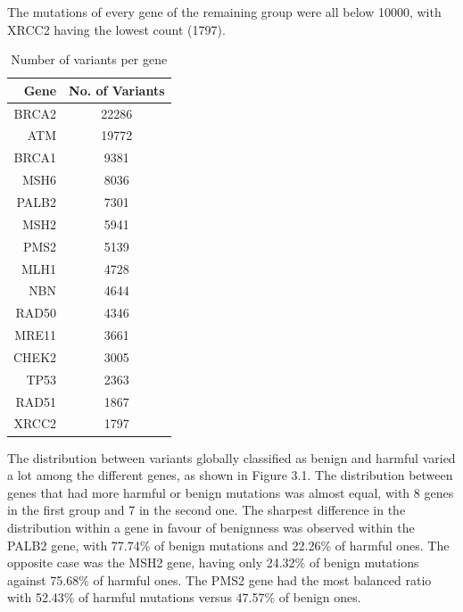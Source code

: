 \documentclass[12pt,MSc,wordcount,anon]{muthesis}
\begin{document}
\begin{flushleft}
The mutations of every gene of the remaining group were all below 10000, with XRCC2 having the lowest count (1797).

\begin{table}
\begin{center}
\begin{tabular}{|r|c|}\hline\hline
Gene&No. of Variants\\\hline
BRCA2&22286\\
ATM&19772\\
BRCA1&9381\\
MSH6&8036\\
PALB2&7301\\
MSH2&5941\\
PMS2&5139\\
MLH1&4728\\
NBN&4644\\
RAD50&4346\\
MRE11&3661\\
CHEK2&3005\\
TP53&2363\\
RAD51&1867\\
XRCC2&1797\\\hline\hline
\end{tabular}
\end{center}
\caption{Number of variants per gene}\label{wombat}
\end{table}

The distribution between variants globally classified as benign and harmful varied a lot among the different genes, as shown in Figure 3.1. The distribution between genes that had more harmful or benign mutations was almost equal, with 8 genes in the first group and 7 in the second one. The sharpest difference in the distribution within a gene in favour of benignness was observed within the PALB2 gene, with 77.74\% of benign mutations and 22.26\% of harmful ones. The opposite case was the MSH2 gene, having only 24.32\% of benign mutations against 75.68\% of harmful ones. The PMS2 gene had the most balanced ratio with 52.43\% of harmful mutations versus 47.57\% of benign ones.


\end{flushleft}
\end{document}
